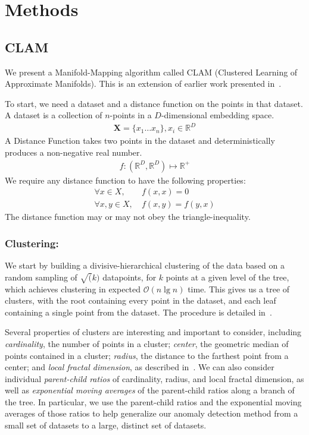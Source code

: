 \section{Methods}
\label{sec:methods}

\subsection{CLAM}
\label{subsec:methods:clam}

We present a Manifold-Mapping algorithm called CLAM (Clustered Learning of Approximate Manifolds).
This is an extension of earlier work presented in~\cite{ishaq2019clustered}.

To start, we need a dataset and a distance function on the points in that dataset.
A dataset is a collection of $n$-points in a $D$-dimensional embedding space.
\begin{gather*}
    \textbf{X} = \{x_1 \dots x_n\}, x_i \in \mathbb{R}^D
\end{gather*}
A Distance Function takes two points in the dataset and deterministically produces a non-negative real number.
\begin{gather*}
    f : (\mathbb{R}^D, \mathbb{R}^D) \mapsto \mathbb{R}^+
\end{gather*}
We require any distance function to have the following properties:
\begin{align*}
    \forall x \in X,    & \ f(x, x) = 0       \\
    \forall x, y \in X, & \ f(x, y) = f(y, x)
\end{align*}
The distance function may or may not obey the triangle-inequality.

\subsubsection{Clustering:}\label{subsubsec:methods:clam:clustering}
We start by building a divisive-hierarchical clustering of the data based on a random sampling of $\sqrt(k)$ datapoints, for $k$ points at a given level of the tree, which achieves clustering in expected $\mathcal{O}(n \lg n)$ time.
This gives us a tree of clusters, with the root containing every point in the dataset, and each leaf containing a single point from the dataset.
The procedure is detailed in~\cite{ishaq2019clustered}.

Several properties of clusters are interesting and important to consider, including \textit{cardinality}, the number of points in a cluster; \textit{center}, the geometric median of points contained in a cluster; \textit{radius}, the distance to the farthest point from a center; and \textit{local fractal dimension}, as described in~\cite{ishaq2019clustered}.
We can also consider individual \textit{parent-child ratios} of cardinality, radius, and local fractal dimension, as well as \textit{exponential moving averages} of the parent-child ratios along a branch of the tree.
In particular, we use the parent-child ratios and the exponential moving averages of those ratios to help generalize our anomaly detection method from a small set of datasets to a large, distinct set of datasets.

